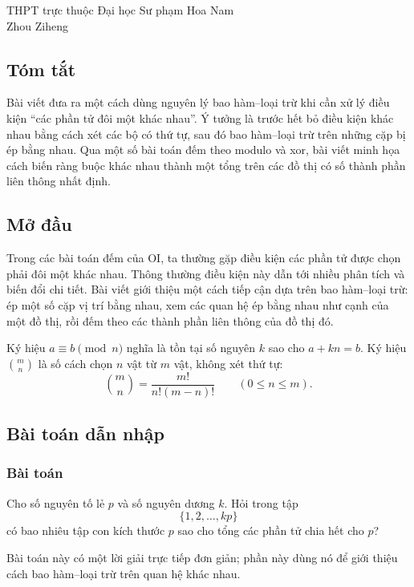 \documentclass[11pt]{article}
\begin{document}
\begin{center}
THPT trực thuộc Đại học Sư phạm Hoa Nam\\
Zhou Ziheng
\end{center}

\subsection*{Tóm tắt}

Bài viết đưa ra một cách dùng nguyên lý bao hàm--loại trừ khi cần xử lý điều
kiện ``các phần tử đôi một khác nhau''. Ý tưởng là trước hết bỏ điều kiện khác
nhau bằng cách xét các bộ có thứ tự, sau đó bao hàm--loại trừ trên những cặp bị
ép bằng nhau. Qua một số bài toán đếm theo modulo và xor, bài viết minh họa
cách biến ràng buộc khác nhau thành một tổng trên các đồ thị có số thành phần
liên thông nhất định.

\subsection{Mở đầu}

Trong các bài toán đếm của OI, ta thường gặp điều kiện các phần tử được chọn
phải đôi một khác nhau. Thông thường điều kiện này dẫn tới nhiều phân tích và
biến đổi chi tiết. Bài viết giới thiệu một cách tiếp cận dựa trên
bao hàm--loại trừ: ép một số cặp vị trí bằng nhau, xem các quan hệ ép bằng nhau
như cạnh của một đồ thị, rồi đếm theo các thành phần liên thông của đồ thị đó.

Ký hiệu $a\equiv b\pmod n$ nghĩa là tồn tại số nguyên $k$ sao cho
$a+kn=b$. Ký hiệu $\binom mn$ là số cách chọn $n$ vật từ $m$ vật, không xét thứ
tự:
\[
  \binom mn=\frac{m!}{n!(m-n)!}\qquad (0\le n\le m).
\]

\subsection{Bài toán dẫn nhập}

\subsubsection{Bài toán}

Cho số nguyên tố lẻ $p$ và số nguyên dương $k$. Hỏi trong tập
\[
  \{1,2,\ldots,kp\}
\]
có bao nhiêu tập con kích thước $p$ sao cho tổng các phần tử chia hết cho $p$?

Bài toán này có một lời giải trực tiếp đơn giản; phần này dùng nó để giới thiệu
cách bao hàm--loại trừ trên quan hệ khác nhau.
\end{document}
